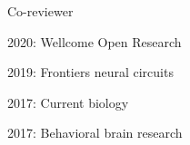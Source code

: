 
\begin{cventries}
\cventry
    {Co-reviewer} %
    {} %
    {} %
    {} %
    {
      \begin{cvitems} %
      \setlength\itemsep{0.5em}
          \item {2020: Wellcome Open Research}
          \item {2019: Frontiers neural circuits}
          \item {2017: Current biology}
          \item {2017: Behavioral brain research}
      \end{cvitems}
    }
\end{cventries} 

